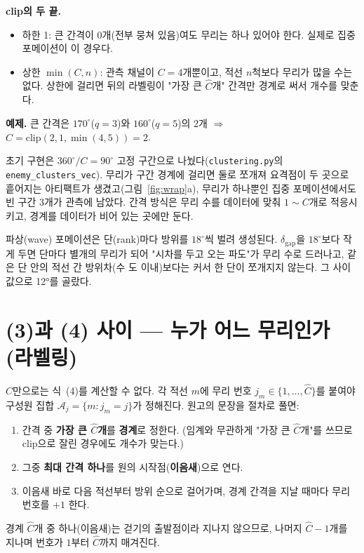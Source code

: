 \documentclass[11pt,a4paper]{article}
\newcommand{\dgap}{\delta_{\mathrm{gap}}}
\begin{document}
\textbf{clip의 두 끝.}
\begin{itemize}
\item 하한 1: 큰 간격이 0개(전부 뭉쳐 있음)여도 무리는 하나 있어야 한다. 실제로 집중 포메이션이 이 경우다.
\item 상한 $\min(C, n)$: 관측 채널이 $C=4$개뿐이고, 적선 $n$척보다 무리가 많을 수는 없다. 상한에 걸리면 뒤의 라벨링이 "가장 큰 $\hat C$개" 간격만 경계로 써서 개수를 맞춘다.
\end{itemize}

\textbf{예제.} 큰 간격은 $170^\circ$($q=3$)와 $160^\circ$($q=5$)의 2개 $\Rightarrow$ $\hat C = \mathrm{clip}(2, 1, \min(4,5)) = 2$.

\begin{whybox}
초기 구현은 $360^\circ/C = 90^\circ$ 고정 구간으로 나눴다(\texttt{clustering.py}의 \texttt{enemy\_clusters\_vec}). 무리가 구간 경계에 걸리면 둘로 쪼개져 요격점이 두 곳으로 흩어지는 아티팩트가 생겼고(그림~\ref{fig:wrap}a), 무리가 하나뿐인 집중 포메이션에서도 빈 구간 3개가 관측에 남았다.
간격 방식은 무리 수를 데이터에 맞춰 $1\sim C$개로 적응시키고, 경계를 데이터가 비어 있는 곳에만 둔다.
\end{whybox}

\begin{whybox}[왜 $\dgap \approx 12^\circ$인가]
파상(wave) 포메이션은 단(rank)마다 방위를 $18^\circ$씩 벌려 생성된다. $\dgap$을 $18^\circ$보다 작게 두면 단마다 별개의 무리가 되어 "시차를 두고 오는 파도"가 무리 수로 드러나고, 같은 단 안의 적선 간 방위차(수 도 이내)보다는 커서 한 단이 쪼개지지 않는다. 그 사이 값으로 12°를 골랐다.
\end{whybox}

\section{(3)과 (4) 사이 --- 누가 어느 무리인가 (라벨링)}

$\hat C$만으로는 식~(4)를 계산할 수 없다. 각 적선 $m$에 무리 번호 $j_m \in \{1,\dots,\hat C\}$를 붙여야 구성원 집합 $\mathcal A_j = \{m : j_m = j\}$가 정해진다. 원고의 문장을 절차로 풀면:
\begin{enumerate}
\item 간격 중 \textbf{가장 큰 $\hat C$개}를 \textbf{경계}로 정한다. (임계와 무관하게 "가장 큰 $\hat C$개"를 쓰므로 clip으로 잘린 경우에도 개수가 맞는다.)
\item 그중 \textbf{최대 간격 하나}를 원의 시작점(\textbf{이음새})으로 연다.
\item 이음새 바로 다음 적선부터 방위 순으로 걸어가며, 경계 간격을 지날 때마다 무리 번호를 $+1$ 한다.
\end{enumerate}
경계 $\hat C$개 중 하나(이음새)는 걷기의 출발점이라 지나지 않으므로, 나머지 $\hat C-1$개를 지나며 번호가 $1$부터 $\hat C$까지 매겨진다.
\end{document}
